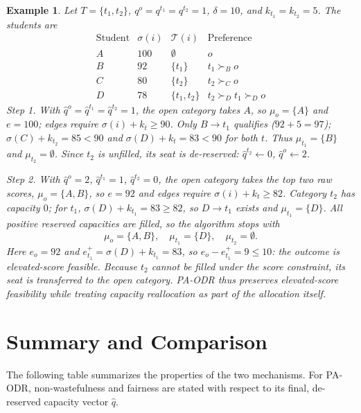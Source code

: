\documentclass[10pt]{article}
\newtheorem{example}{Example}
\newcommand{\T}{\mathcal{T}}
\newcommand{\1}{\mathbf{1}}
\begin{document}
\begin{example}
Let $T=\{t_1,t_2\}$, $q^o=q^{t_1}=q^{t_2}=1$, $\delta=10$, and $k_{t_1}=k_{t_2}=5$. The students are
\[
\begin{array}{c|c|c|c}
\text{Student} & \sigma(i) & \T(i) & \text{Preference} \\
\hline
A & 100 & \emptyset & o \\
B & 92  & \{t_1\} & t_1\succ_B o \\
C & 80  & \{t_2\} & t_2\succ_C o \\
D & 78  & \{t_1,t_2\} & t_2\succ_D t_1\succ_D o
\end{array}
\]
\emph{Step 1.} With $\hat q^o=\hat q^{t_1}=\hat q^{t_2}=1$, the open category takes $A$, so $\mu_o=\{A\}$ and $e=100$; edges require $\sigma(i)+k_t\ge 90$. Only $B\to t_1$ qualifies ($92+5=97$); $\sigma(C)+k_{t_2}=85<90$ and $\sigma(D)+k_t=83<90$ for both $t$. Thus $\mu_{t_1}=\{B\}$ and $\mu_{t_2}=\emptyset$. Since $t_2$ is unfilled, its seat is de-reserved: $\hat q^{t_2}\gets 0$, $\hat q^o\gets 2$.

\emph{Step 2.} With $\hat q^o=2$, $\hat q^{t_1}=1$, $\hat q^{t_2}=0$, the open category takes the top two raw scores, $\mu_o=\{A,B\}$, so $e=92$ and edges require $\sigma(i)+k_t\ge 82$. Category $t_2$ has capacity $0$; for $t_1$, $\sigma(D)+k_{t_1}=83\ge 82$, so $D\to t_1$ exists and $\mu_{t_1}=\{D\}$. All positive reserved capacities are filled, so the algorithm stops with
\[
\mu_o=\{A,B\},\quad \mu_{t_1}=\{D\},\quad \mu_{t_2}=\emptyset.
\]
Here $e_o=92$ and $e_{t_1}^+=\sigma(D)+k_{t_1}=83$, so $e_o-e_{t_1}^+=9\le 10$: the outcome is elevated-score feasible. Because $t_2$ cannot be filled under the score constraint, its seat is transferred to the open category. PA-ODR thus preserves elevated-score feasibility while treating capacity reallocation as part of the allocation itself.
\end{example}

\section{Summary and Comparison}

The following table summarizes the properties of the two mechanisms. For PA-ODR, non-wastefulness and fairness are stated with respect to its final, de-reserved capacity vector $\hat q$.
\end{document}
